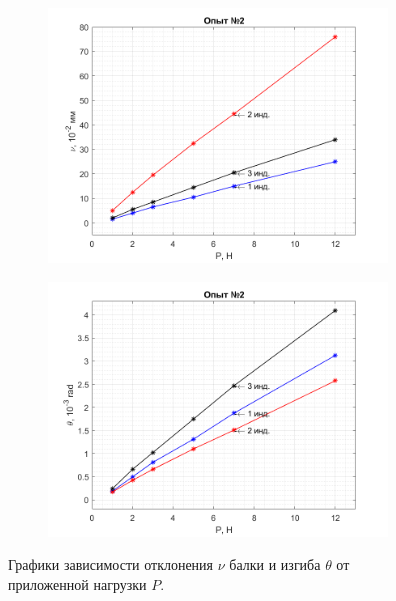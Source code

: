 \documentclass[12pt, a4paper]{article}
\begin{document}
    \begin{figure}[h!]
        \centering
        \hspace{-2cm}
        \begin{subfigure}{0.4\textwidth}
            \centering
            \includegraphics[width = 9cm]{figure_3.png}
        \end{subfigure}
        \hspace{1cm}
        \begin{subfigure}{0.4\textwidth}
            \centering
            \includegraphics[width = 9cm]{figure_4.png}
        \end{subfigure}
        \caption{\centering Графики зависимости отклонения $\nu$ балки и изгиба $\theta$ от приложенной нагрузки $P$.}
        \label{fig3}
    \end{figure}
    
    \newpage
    
\end{document}

